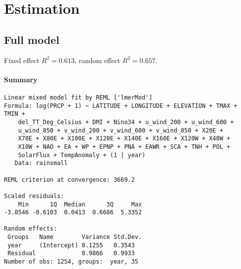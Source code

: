 \documentclass[fleqn,11pt]{article}
\begin{document}
\section{Estimation}

\subsection{Full model}
Fixed effect $R^2 = 0.613$, random effect $R^2 = 0.657$.

\paragraph{Summary}
\begin{scriptsize}
\singlespacing
\begin{verbatim}
Linear mixed model fit by REML ['lmerMod']
Formula: log(PRCP + 1) ~ LATITUDE + LONGITUDE + ELEVATION + TMAX + TMIN +  
    del_TT_Deg_Celsius + DMI + Nino34 + u_wind_200 + u_wind_600 +  
    u_wind_850 + v_wind_200 + v_wind_600 + v_wind_850 + X20E +  
    X70E + X80E + X100E + X120E + X140E + X160E + X120W + X40W +  
    X10W + NAO + EA + WP + EPNP + PNA + EAWR + SCA + TNH + POL +  
    SolarFlux + TempAnomaly + (1 | year)
   Data: rainsmall

REML criterion at convergence: 3669.2

Scaled residuals: 
    Min      1Q  Median      3Q     Max 
-3.8546 -0.6103  0.0413  0.6686  5.3352 

Random effects:
 Groups   Name        Variance Std.Dev.
 year     (Intercept) 0.1255   0.3543  
 Residual             0.9866   0.9933  
Number of obs: 1254, groups:  year, 35


\end{verbatim}
\end{scriptsize}
\end{document}
